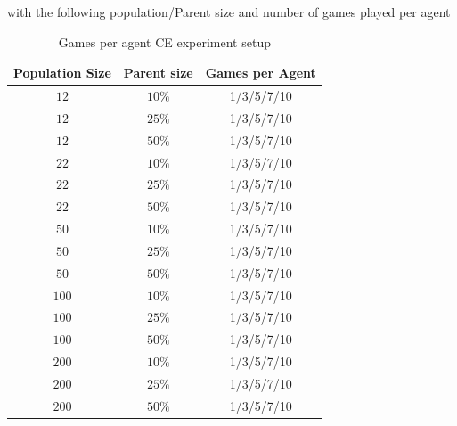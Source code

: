 with the following population/Parent size and number of games played per agent


\begin{table}[H]
\centering
\begin{tabular}{c c c}
Population Size & Parent size & Games per Agent\\
\hline
$12$ & $10\%$ & 1/3/5/7/10\\
$12$ & $25\%$ & 1/3/5/7/10\\
$12$ & $50\%$ & 1/3/5/7/10\\
$22$ & $10\%$ & 1/3/5/7/10\\
$22$ & $25\%$ & 1/3/5/7/10\\
$22$ & $50\%$ & 1/3/5/7/10\\
$50$ & $10\%$ & 1/3/5/7/10\\
$50$ & $25\%$ & 1/3/5/7/10\\
$50$ & $50\%$ & 1/3/5/7/10\\
$100$ & $10\%$ & 1/3/5/7/10\\
$100$ & $25\%$ & 1/3/5/7/10\\
$100$ & $50\%$ & 1/3/5/7/10\\
$200$ & $10\%$ & 1/3/5/7/10\\
$200$ & $25\%$ & 1/3/5/7/10\\
$200$ & $50\%$ & 1/3/5/7/10
\end{tabular}
\caption{Games per agent CE experiment setup}
\end{table}

\clearpage

